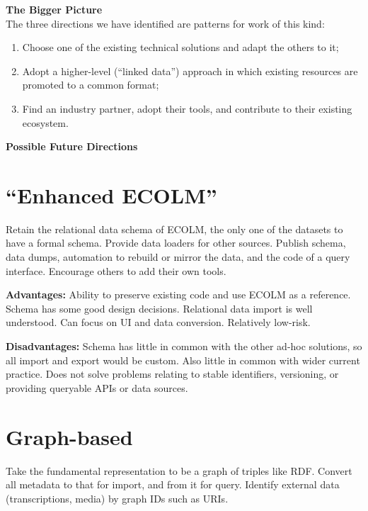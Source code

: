 \documentclass[a0,landscape]{a0poster}
\begin{document}
\begin{multicols}{3}
\begin{sloppypar}
  \vspace{1cm}
  \noindent\textbf{\LARGE The Bigger Picture}\\

  \noindent The three directions we have identified are patterns for work
  of this kind:

  \begin{enumerate}
  \item Choose one of the existing technical solutions and adapt the
    others to it;
  \item Adopt a higher-level (``linked data'') approach in which
    existing resources are promoted to a common format;
  \item Find an industry partner, adopt their tools, and contribute to
    their existing ecosystem.
  \end{enumerate}

  \columnbreak

  \noindent\textbf{\LARGE Possible Future Directions}\\
  \vspace{-3cm}
  \section{``Enhanced ECOLM''}

  Retain the relational data schema of ECOLM, the only one of the
  datasets to have a formal schema. Provide data loaders for other
  sources. Publish schema, data dumps, automation to rebuild or mirror
  the data, and the code of a query interface. Encourage others to
  add their own tools.

  \noindent\textbf{Advantages:} Ability to preserve existing code and
  use ECOLM as a reference. Schema has some good design
  decisions. Relational data import is well understood. Can focus on
  UI and data conversion. Relatively low-risk.

  \noindent\textbf{Disadvantages:} Schema has little in common with
  the other ad-hoc solutions, so all import and export would be
  custom. Also little in common with wider current practice. Does not
  solve problems relating to stable identifiers, versioning, or
  providing queryable APIs or data sources.

  \vspace{-1cm}
  \section{Graph-based}

  Take the fundamental representation to be a graph of triples like
  RDF. Convert all metadata to that for import, and from it for
  query. Identify external data (transcriptions, media) by graph IDs
  such as URIs.


\end{sloppypar}
\end{multicols}
\end{document}
